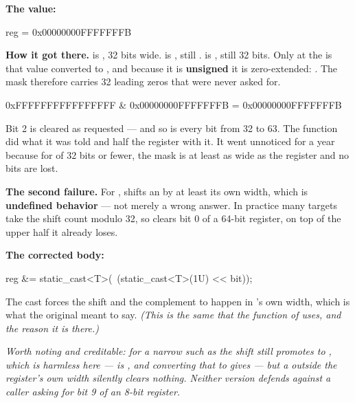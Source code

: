 \textbf{The value:}

\begin{console}
reg = 0x00000000FFFFFFFB
\end{console}

\textbf{How it got there.}  is , 32 bits wide.  is
, still .  is , still 32 bits. Only at the
\code{&=} is that value converted to , and because it is \textbf{unsigned} it is
zero-extended: . The mask therefore carries 32 leading zeros that were never
asked for.

\begin{console}
0xFFFFFFFFFFFFFFFF & 0x00000000FFFFFFFB = 0x00000000FFFFFFFB
\end{console}

\noindent Bit 2 is cleared as requested --- and so is every bit from 32 to 63. The function did what
it was told and half the register with it. It went unnoticed for a year because for  of 32
bits or fewer, the mask is at least as wide as the register and no bits are lost. 

\textbf{The second failure.} For ,  shifts an  by
at least its own width, which is \textbf{undefined behavior} --- not merely a wrong answer. In
practice many targets take the shift count modulo 32, so  clears bit 0 of a
64-bit register, on top of the upper half it already loses. 

\textbf{The corrected body:}

\begin{cppcode}
reg &= static_cast<T>(~(static_cast<T>(1U) << bit));
\end{cppcode}

\noindent The cast forces the shift and the complement to happen in 's own width, which is
what the original meant to say. \textit{(This is the same  that the
 function of  uses, and the reason it is there.)} 

\textit{Worth noting and creditable: for a narrow  such as  the shift
still promotes to , which is harmless here ---  is , and
converting that to  gives  --- but a  outside the register's
own width silently clears nothing. Neither version defends against a caller asking for bit 9 of an
8-bit register.}

